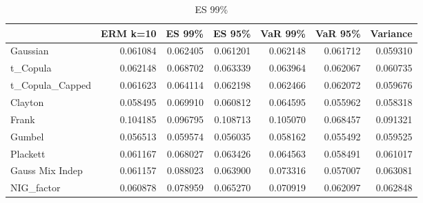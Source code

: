 \begin{table}
\begin{tabular}{lrrrrrr}
\toprule
{} &  ERM k=10 &    ES 99\% &    ES 95\% &   VaR 99\% &   VaR 95\% &  Variance \\
\midrule
Gaussian        &  0.061084 &  0.062405 &  0.061201 &  0.062148 &  0.061712 &  \color{blue}0.059310 \\
t\_Copula        &  0.062148 &  0.068702 &  0.063339 &  0.063964 &  0.062067 & \color{blue}0.060735 \\
t\_Copula\_Capped &  0.061623 &  0.064114 &  0.062198 &  0.062466 &  0.062072 & \color{blue}0.059676 \\
Clayton         &  0.058495 &  0.069910 &  0.060812 &  0.064595 &  \color{blue}0.055962 &  0.058318 \\
Frank           &  0.104185 &  0.096795 &  0.108713 &  0.105070 &  \color{blue}0.068457 &  0.091321 \\
Gumbel          &  0.056513 &  0.059574 &  0.056035 &  0.058162 &  \color{blue}0.055492 &  0.059525 \\
Plackett        &  0.061167 &  0.068027 &  0.063426 &  0.064563 &  \color{blue}0.058491 &  0.061017 \\
Gauss Mix Indep &  0.061157 &  0.088023 &  0.063900 &  0.073316 &  \color{blue}0.057007 &  0.063081 \\
NIG\_factor      &  \color{blue}0.060878 &  0.078959 &  0.065270 &  0.070919 &  0.062097 &  0.062848 \\
\bottomrule
\end{tabular}
\caption{ES 99\%}
\end{table}

